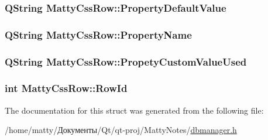 \subsubsection[{\texorpdfstring{Property\+Default\+Value}{PropertyDefaultValue}}]{\setlength{\rightskip}{0pt plus 5cm}Q\+String Matty\+Css\+Row\+::\+Property\+Default\+Value}\hypertarget{struct_matty_css_row_ab411d09040e1174d9c52548e70b477fc}{}\label{struct_matty_css_row_ab411d09040e1174d9c52548e70b477fc}
\subsubsection[{\texorpdfstring{Property\+Name}{PropertyName}}]{\setlength{\rightskip}{0pt plus 5cm}Q\+String Matty\+Css\+Row\+::\+Property\+Name}\hypertarget{struct_matty_css_row_ad2039ab001752cafade09b6039df2b0a}{}\label{struct_matty_css_row_ad2039ab001752cafade09b6039df2b0a}
\subsubsection[{\texorpdfstring{Propety\+Custom\+Value\+Used}{PropetyCustomValueUsed}}]{\setlength{\rightskip}{0pt plus 5cm}Q\+String Matty\+Css\+Row\+::\+Propety\+Custom\+Value\+Used}\hypertarget{struct_matty_css_row_a72f2d0b934455456cc3dc37ac908e19a}{}\label{struct_matty_css_row_a72f2d0b934455456cc3dc37ac908e19a}
\subsubsection[{\texorpdfstring{Row\+Id}{RowId}}]{\setlength{\rightskip}{0pt plus 5cm}int Matty\+Css\+Row\+::\+Row\+Id}\hypertarget{struct_matty_css_row_a6e993981771efed8d27259785ddd430e}{}\label{struct_matty_css_row_a6e993981771efed8d27259785ddd430e}


The documentation for this struct was generated from the following file\+:\begin{DoxyCompactItemize}
\item 
/home/matty/Документы/\+Qt/qt-\/proj/\+Matty\+Notes/\hyperlink{dbmanager_8h}{dbmanager.\+h}\end{DoxyCompactItemize}
